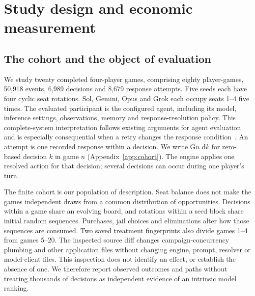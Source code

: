 
\section{Study design and economic measurement}
\label{sec:sol-economic-methods}



\subsection{The cohort and the object of evaluation}

We study twenty completed four-player games, comprising eighty player-games, 50,918 events, 6,989 decisions and 8,679 response attempts. Five seeds each have four cyclic seat rotations. Sol, Gemini, Opus and Grok each occupy seats 1--4 five times. The evaluated participant is the configured agent, including its model, inference settings, observations, memory and response-resolution policy. This complete-system interpretation follows existing arguments for agent evaluation and is especially consequential when a retry changes the response condition~\cite{kapoor2026hal,zhang2026dece}. An attempt is one recorded response within a decision. We write G$n$ d$k$ for zero-based decision $k$ in game $n$ (Appendix~\ref{app:cohort}). The engine applies one resolved action for that decision; several decisions can occur during one player's turn.

The finite cohort is our population of description. Seat balance does not make the games independent draws from a common distribution of opportunities. Decisions within a game share an evolving board, and rotations within a seed block share initial random sequences. Purchases, jail choices and eliminations alter how those sequences are consumed. Two saved treatment fingerprints also divide games 1--4 from games 5--20. The inspected source diff changes campaign-concurrency plumbing and other application files without changing engine, prompt, resolver or model-client files. This inspection does not identify an effect, or establish the absence of one. We therefore report observed outcomes and paths without treating thousands of decisions as independent evidence of an intrinsic model ranking.

